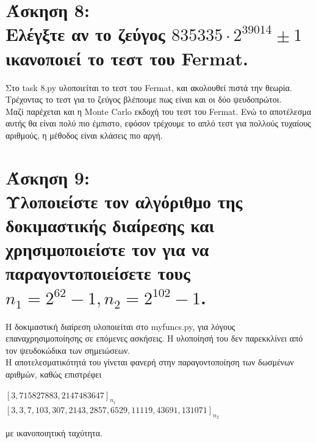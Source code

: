 \documentclass{article}
\newcommand{\lt}[1]{\latintext #1\greektext}
\newcommand{\task}[2]{\newpage\section*{Άσκηση #1:\\#2}}
\begin{document}
\task{8}{
    Ελέγξτε αν το ζεύγος $835335\cdot2^{39014} \pm 1$ ικανοποιεί το τεστ του \lt{Fermat}.
}
{
    Στο \lt{task 8.py} υλοποιείται το τεστ του \lt{Fermat}, και ακολουθεί πιστά την θεωρία. Τρέχοντας το τεστ για το ζεύγος βλέπουμε πως είναι και οι δύο ψευδοπρώτοι.\\
    
    Μαζί παρέχεται και η \lt{Monte Carlo} εκδοχή του τεστ του \lt{Fermat}. Ενώ το αποτέλεσμα αυτής θα είναι πολύ πιο έμπιστο, εφόσον τρέχουμε το απλό τεστ για πολλούς τυχαίους αριθμούς, η μέθοδος είναι κλάσεις πιο αργή.
}

\task{9}{
    Υλοποιείστε τον αλγόριθμο της δοκιμαστικής διαίρεσης και χρησιμοποιείστε τον για να\\ παραγοντοποιείσετε τους $n_1 = 2^{62} - 1, n_2 = 2^{102} - 1$.
}
{
    Η δοκιμαστική διαίρεση υλοποιείται στο \lt{myfuncs.py}, για λόγους επαναχρησιμοποίησης σε επόμενες ασκήσεις. Η υλοποίησή του δεν παρεκκλίνει από τον ψευδοκώδικα των σημειώσεων.\\
    
    Η αποτελεσματικότητά του γίνεται φανερή στην παραγοντοποίηση των δωσμένων αριθμών, καθώς επιστρέφει
    \begin{center}
        $[3, 715827883, 2147483647]_{n_1}$\\
        
        $[3, 3, 7, 103, 307, 2143, 2857, 6529, 11119, 43691, 131071]_{n_2}$
    \end{center}
    με ικανοποιητική ταχύτητα.
}
\end{document}
